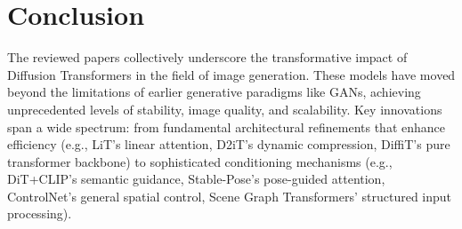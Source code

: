 \documentclass[a4paper]{article}
\begin{document}
\section{Conclusion}
The reviewed papers collectively underscore the transformative impact of Diffusion Transformers in the field of image generation. These models have moved beyond the limitations of earlier generative paradigms like GANs, achieving unprecedented levels of stability, image quality, and scalability. Key innovations span a wide spectrum: from fundamental architectural refinements that enhance efficiency (e.g., LiT's \cite{Jiang2025LiT} linear attention, D2iT's \cite{Jia2025D2iT} dynamic compression, DiffiT's \cite{Hatamizadeh2023DiffiT} pure transformer backbone) to sophisticated conditioning mechanisms (e.g., DiT+CLIP's \cite{Zhu2025ImageToImage} semantic guidance, Stable-Pose's \cite{Wang2024StablePose} pose-guided attention, ControlNet's \cite{Zhang2023ControlNet} general spatial control, Scene Graph Transformers' \cite{Sortino2023TransformerSceneGraphs} structured input processing).
\end{document}
